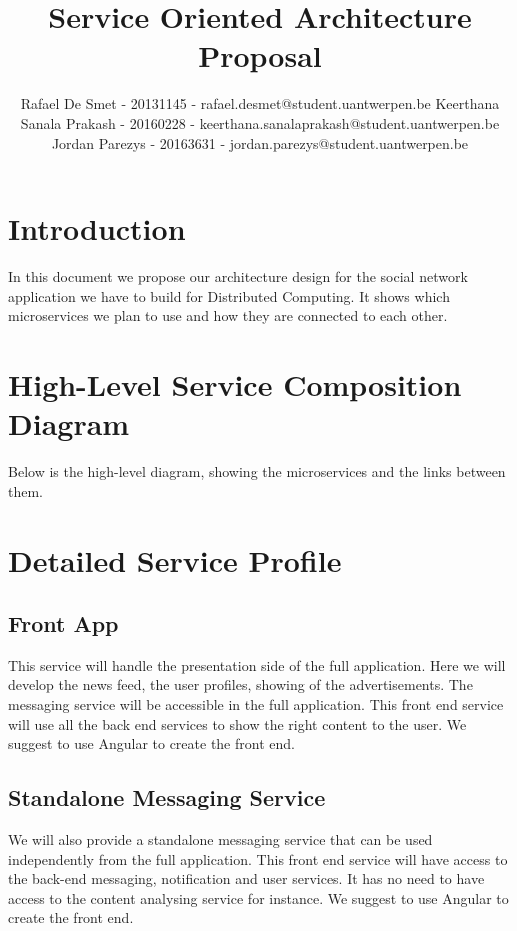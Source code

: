 \documentclass[a4paper,12pt]{article}
\begin{document}
\title{Service Oriented Architecture Proposal}
\author{Rafael De Smet - 20131145 - rafael.desmet@student.uantwerpen.be
		Keerthana Sanala Prakash - 20160228 - keerthana.sanalaprakash@student.uantwerpen.be
		Jordan Parezys - 20163631 - jordan.parezys@student.uantwerpen.be}
\date{}
\maketitle

\section{Introduction}

In this document we propose our architecture design for the social network application we have to build for Distributed Computing. It shows which microservices we plan to use and how they are connected to each other.

\section{High-Level Service Composition Diagram}

Below is the high-level diagram, showing the microservices and the links between them.

\section{Detailed Service Profile}

\subsection{Front App}

This service will handle the presentation side of the full application. Here we will develop the news feed, the user profiles, showing of the advertisements. The messaging service will be accessible in the full application. This front end service will use all the back end services to show the right content to the user.
\newline
\newline
We suggest to use Angular to create the front end.

\subsection{Standalone Messaging Service}

We will also provide a standalone messaging service that can be used independently from the full application. This front end service will have access to the back-end messaging, notification and user services. It has no need to have access to the content analysing service for instance.
\newline
\newline
We suggest to use Angular to create the front end.
\end{document}
